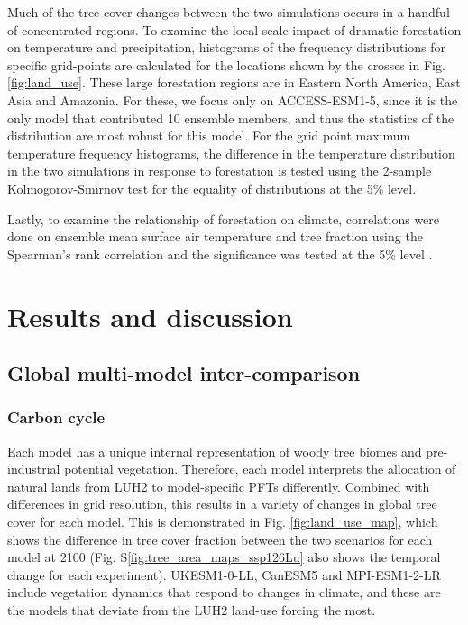 \documentclass[]{article}
\begin{document}
Much of the tree cover changes between the two simulations occurs in a handful of concentrated regions.
To examine the local scale impact of dramatic forestation on temperature and precipitation, histograms of the frequency distributions for specific grid-points are calculated for the locations shown by the crosses in Fig. \ref{fig:land_use}.
These large forestation regions are in Eastern North America, East Asia and Amazonia.
For these, we focus only on ACCESS-ESM1-5, since it is the only model that contributed 10 ensemble members, and thus the statistics of the distribution are most robust for this model.
For the grid point maximum temperature frequency histograms, the difference in the temperature distribution in the two simulations in response to forestation is tested using the 2-sample Kolmogorov-Smirnov test for the equality of distributions at the 5\% level.

Lastly, to examine the relationship of forestation on climate, correlations were done on ensemble mean surface air temperature and tree fraction using the Spearman's rank correlation and the significance was tested at the 5\% level \parencite{kokoska2000crc}.

\section{Results and discussion}

\subsection{Global multi-model inter-comparison}

\subsubsection{Carbon cycle}

Each model has a unique internal representation of woody tree biomes and pre-industrial potential vegetation.
Therefore, each model interprets the allocation of natural lands from LUH2 to model-specific PFTs differently.
Combined with differences in grid resolution, this results in a variety of changes in global tree cover for each model. This is demonstrated in Fig. \ref{fig:land_use_map}, which shows the difference in tree cover fraction between the two scenarios for each model at 2100 (Fig. S\ref{fig:tree_area_maps_ssp126Lu} also shows the temporal change for each experiment).
UKESM1-0-LL, CanESM5 and MPI-ESM1-2-LR include vegetation dynamics that respond to changes in climate, and these are the models that deviate from the LUH2 land-use forcing the most.
\end{document}
